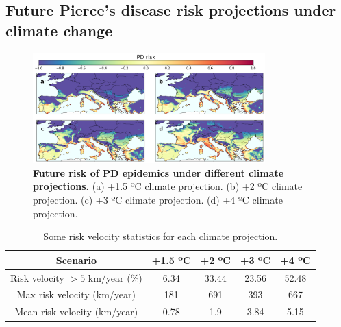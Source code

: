 \subsection{Future Pierce’s disease risk projections under climate change}

\begin{figure}[H]
    \centering
    \includegraphics[width=0.8\textwidth]{Figures/Future_risk_vector.pdf}
    \caption{\textbf{Future risk of PD epidemics under different climate
            projections.} (a) +1.5 ºC climate projection. (b) +2 ºC climate
        projection. (c)
        +3 ºC climate projection. (d) +4 ºC climate projection.}
    \label{fig:PD_future_risk}
\end{figure}

\begin{table}[H]
    \centering
    \caption{Some risk velocity statistics for each climate projection.}
    \begin{tabular}{ccccc}
        \hline \hline
        \textbf{Scenario}                & \textbf{+1.5} ºC & \textbf{+2 ºC} &
        \textbf{+3
        ºC}                              & \textbf{+4 ºC}
        \\ \hline
        Risk velocity $> 5$ km/year (\%) & 6.34             & 33.44          &
        23.56                            & 52.48
        \\
        Max risk velocity (km/year)      & 181              & 691            &
        393                              & 667
        \\
        Mean risk velocity (km/year)     & 0.78             & 1.9            &
        3.84                             & 5.15
        \\ \hline
        \hline
    \end{tabular}
    \label{tab:risk_vel}
\end{table}

